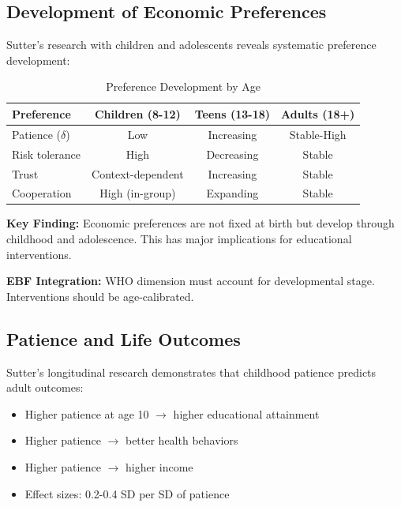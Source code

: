 \subsection{Development of Economic Preferences}
\label{sec:sut-development}

Sutter's research with children and adolescents reveals systematic
preference development:

\begin{table}[htbp]
\centering
\caption{Preference Development by Age}
\label{tab:sut-development}
\begin{tabular}{@{}lccc@{}}
\toprule
\textbf{Preference} & \textbf{Children (8-12)} & \textbf{Teens (13-18)} & \textbf{Adults (18+)} \\
\midrule
Patience ($\delta$) & Low & Increasing & Stable-High \\
Risk tolerance & High & Decreasing & Stable \\
Trust & Context-dependent & Increasing & Stable \\
Cooperation & High (in-group) & Expanding & Stable \\
\bottomrule
\end{tabular}
\end{table}

\textbf{Key Finding:} Economic preferences are not fixed at birth but develop
through childhood and adolescence. This has major implications for
educational interventions.

\textbf{EBF Integration:} WHO dimension must account for developmental stage.
Interventions should be age-calibrated.

\subsection{Patience and Life Outcomes}
\label{sec:sut-patience}

Sutter's longitudinal research demonstrates that childhood patience predicts
adult outcomes:

\begin{itemize}[nosep]
    \item Higher patience at age 10 $\rightarrow$ higher educational attainment
    \item Higher patience $\rightarrow$ better health behaviors
    \item Higher patience $\rightarrow$ higher income
    \item Effect sizes: 0.2-0.4 SD per SD of patience
\end{itemize}

